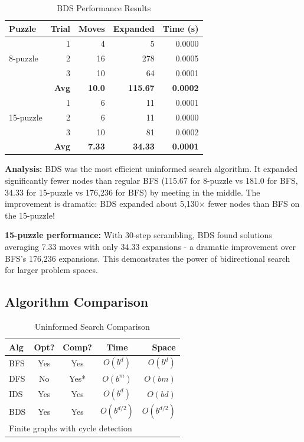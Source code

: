 \documentclass[letterpaper]{article}
\begin{document}
\begin{table}[h]
\centering
\tiny
\begin{tabular}{lrrrr}
\toprule
\textbf{Puzzle} & \textbf{Trial} & \textbf{Moves} & \textbf{Expanded} & \textbf{Time (s)} \\
\midrule
\multirow{3}{*}{8-puzzle} & 1 & 4 & 5 & 0.0000 \\
& 2 & 16 & 278 & 0.0005 \\
& 3 & 10 & 64 & 0.0001 \\
\cmidrule{2-5}
& \textbf{Avg} & \textbf{10.0} & \textbf{115.67} & \textbf{0.0002} \\
\midrule
\multirow{3}{*}{15-puzzle} & 1 & 6 & 11 & 0.0001 \\
& 2 & 6 & 11 & 0.0000 \\
& 3 & 10 & 81 & 0.0002 \\
\cmidrule{2-5}
& \textbf{Avg} & \textbf{7.33} & \textbf{34.33} & \textbf{0.0001} \\
\bottomrule
\end{tabular}
\caption{BDS Performance Results}
\end{table}

\textbf{Analysis:} BDS was the most efficient uninformed search algorithm. It expanded significantly fewer nodes than regular BFS (115.67 for 8-puzzle vs 181.0 for BFS, 34.33 for 15-puzzle vs 176,236 for BFS) by meeting in the middle. The improvement is dramatic: BDS expanded about 5,130× fewer nodes than BFS on the 15-puzzle!

\textbf{15-puzzle performance:} With 30-step scrambling, BDS found solutions averaging 7.33 moves with only 34.33 expansions - a dramatic improvement over BFS's 176,236 expansions. This demonstrates the power of bidirectional search for larger problem spaces.

\subsection{Algorithm Comparison}

\begin{table}[h]
\centering
\tiny
\begin{tabular}{lcccr}
\toprule
\textbf{Alg} & \textbf{Opt?} & \textbf{Comp?} & \textbf{Time} & \textbf{Space} \\
\midrule
BFS & Yes & Yes & $O(b^d)$ & $O(b^d)$ \\
DFS & No & Yes* & $O(b^m)$ & $O(bm)$ \\
IDS & Yes & Yes & $O(b^d)$ & $O(bd)$ \\
BDS & Yes & Yes & $O(b^{d/2})$ & $O(b^{d/2})$ \\
\bottomrule
\multicolumn{5}{l}{\tiny *Finite graphs with cycle detection}
\end{tabular}
\caption{Uninformed Search Comparison}
\end{table}
\end{document}
